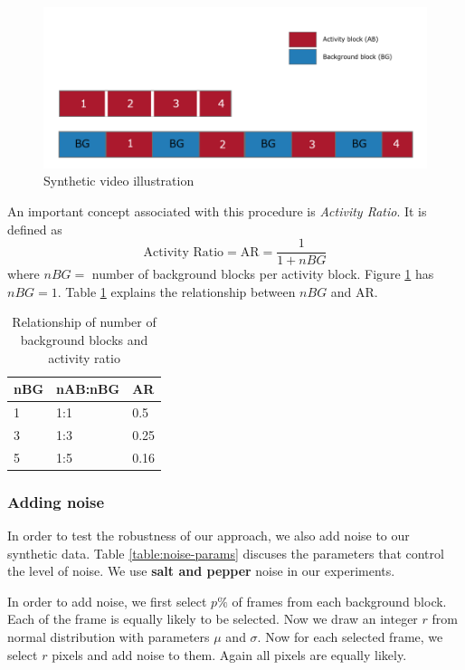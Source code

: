 \begin{figure}
    \centering
    \includegraphics[width=\linewidth]{images/synthetic-video.PNG}
    \caption{Synthetic video illustration}
    \label{fig:synthetic-video}
\end{figure}

An important concept associated with this procedure is \textit{Activity Ratio}. It is defined as 
$$ \text{Activity Ratio} = \text{AR} = \frac{1}{1+nBG} $$
where $nBG=$ number of background blocks per activity block. Figure \ref{fig:synthetic-video} has $nBG=1$. Table \ref{table:activity-ratio} explains the relationship between $nBG$ and AR. 


\begin{table}
\centering
\caption{Relationship of number of background blocks and activity ratio} \vspace{5pt}
\label{table:activity-ratio}
\begin{tabular}{@{}| l | l | l | @{}} \hline
nBG & nAB:nBG & AR   \\ \hline \hline
1   & 1:1     & 0.5  \\
3   & 1:3     & 0.25 \\
5   & 1:5     & 0.16 \\ \hline
\end{tabular}
\end{table}

\subsubsection{Adding noise}
In order to test the robustness of our approach, we also add noise to our synthetic data. Table \ref{table:noise-params} discuses the parameters that control the level of noise. We use \textbf{salt and pepper} noise in our experiments.

In order to add noise, we first select $p\%$ of frames from each background block. Each of the frame is equally likely to be selected. Now we draw an integer $r$ from normal distribution with parameters $\mu$ and $\sigma$. Now for each selected frame, we select $r$ pixels and add noise to them. Again all pixels are equally likely. 

